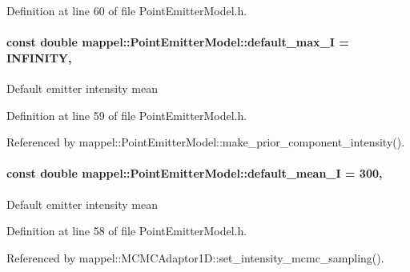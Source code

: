 Definition at line 60 of file Point\+Emitter\+Model.\+h.

\paragraph[{\texorpdfstring{default\+\_\+max\+\_\+I}{default_max_I}}]{\setlength{\rightskip}{0pt plus 5cm}const double mappel\+::\+Point\+Emitter\+Model\+::default\+\_\+max\+\_\+I = I\+N\+F\+I\+N\+I\+TY\hspace{0.3cm}{\ttfamily [static]}, {\ttfamily [inherited]}}\hypertarget{classmappel_1_1PointEmitterModel_acca80757a9a285a9e6eedea167d038c7}{}\label{classmappel_1_1PointEmitterModel_acca80757a9a285a9e6eedea167d038c7}
Default emitter intensity mean 

Definition at line 59 of file Point\+Emitter\+Model.\+h.



Referenced by mappel\+::\+Point\+Emitter\+Model\+::make\+\_\+prior\+\_\+component\+\_\+intensity().

\paragraph[{\texorpdfstring{default\+\_\+mean\+\_\+I}{default_mean_I}}]{\setlength{\rightskip}{0pt plus 5cm}const double mappel\+::\+Point\+Emitter\+Model\+::default\+\_\+mean\+\_\+I = 300\hspace{0.3cm}{\ttfamily [static]}, {\ttfamily [inherited]}}\hypertarget{classmappel_1_1PointEmitterModel_a575dd30a0afb886db82ac725c8cc8df3}{}\label{classmappel_1_1PointEmitterModel_a575dd30a0afb886db82ac725c8cc8df3}
Default emitter intensity mean 

Definition at line 58 of file Point\+Emitter\+Model.\+h.



Referenced by mappel\+::\+M\+C\+M\+C\+Adaptor1\+D\+::set\+\_\+intensity\+\_\+mcmc\+\_\+sampling().

